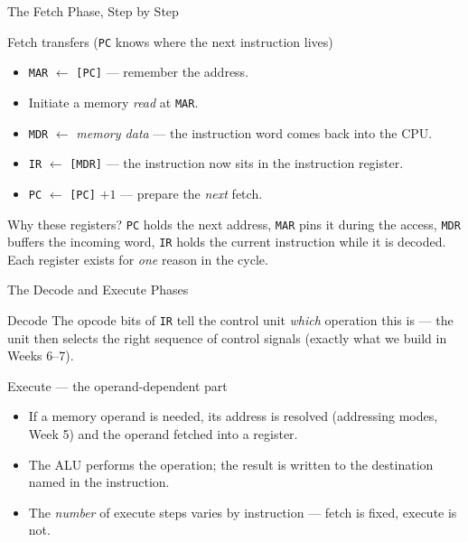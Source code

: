 \documentclass[aspectratio=169]{beamer}
\begin{document}
\begin{frame}{The Fetch Phase, Step by Step}
  \footnotesize
  \begin{block}{Fetch transfers (\texttt{PC} knows where the next instruction lives)}
    \begin{itemize}
      \item \texttt{MAR} $\gets$ \texttt{[PC]} \quad --- remember the address.
      \item Initiate a memory \emph{read} at \texttt{MAR}.
      \item \texttt{MDR} $\gets$ \emph{memory data} \quad --- the instruction
        word comes back into the CPU.
      \item \texttt{IR} $\gets$ \texttt{[MDR]} \quad --- the instruction now
        sits in the instruction register.
      \item \texttt{PC} $\gets$ \texttt{[PC]} $+ 1$ \quad --- prepare the
        \emph{next} fetch.
    \end{itemize}
  \end{block}
  \begin{exampleblock}{Why these registers?}
    \texttt{PC} holds the next address, \texttt{MAR} pins it during the access,
    \texttt{MDR} buffers the incoming word, \texttt{IR} holds the current
    instruction while it is decoded. Each register exists for \emph{one} reason
    in the cycle.
  \end{exampleblock}
\end{frame}

\begin{frame}{The Decode and Execute Phases}
  \begin{block}{Decode}
    The opcode bits of \texttt{IR} tell the control unit \emph{which} operation
    this is --- the unit then selects the right sequence of control signals
    (exactly what we build in Weeks 6--7).
  \end{block}
  \begin{exampleblock}{Execute --- the operand-dependent part}
    \begin{itemize}
      \item If a memory operand is needed, its address is resolved (addressing
        modes, Week 5) and the operand fetched into a register.
      \item The ALU performs the operation; the result is written to the
        destination named in the instruction.
      \item The \emph{number} of execute steps varies by instruction --- fetch
        is fixed, execute is not.
    \end{itemize}
  \end{exampleblock}
\end{frame}
\end{document}
